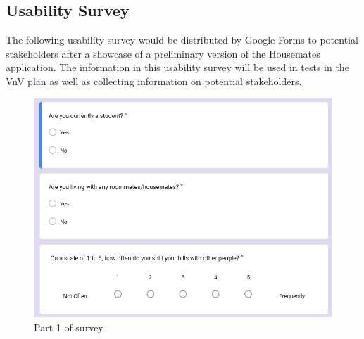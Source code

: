 \documentclass[12pt, titlepage]{article}
\begin{document}

\subsection{Usability Survey}

The following usability survey would be distributed by Google Forms to potential stakeholders after a showcase of a preliminary version of the Housemates application. The information in this usability survey will be used in tests in the VnV plan as well as collecting information on potential stakeholders.

\begin{figure}[H]
    \centering
    \includegraphics[width=1\linewidth]{survey_part_1.png}
    \caption{Part 1 of survey}
    \label{fig:pt1}
\end{figure}
\end{document}

